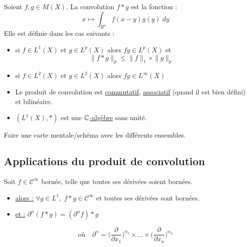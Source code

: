 \begin{theorem}
    Soient $f,g \in M(X)$. La convolution $f \ast g$ est la fonction :
        \[ x \longmapsto \int_{R^n} f(x-y) g(y) \; dy \] 
    Elle est définie dans les cas suivants :
    \begin{itemize}
        \item si $f \in L^1(X)$ et $g \in L^p(X)$ alors $fg \in L^p(X)$ et 
            \[ \| f \ast g\|_p \leq \|f\|_1 \times \|g\|_p \] 
        \item si $f \in L^2(X)$ et $g \in L^2(X)$ alors $fg \in L^\infty(X)$
    \end{itemize}
\end{theorem}

\begin{prop}
    \begin{itemize}
        \item Le produit de convolution est \underline{commutatif}, \underline{associatif} (quand il est bien défini) et bilinéaire.
        \item $(L^1(X),\ast)$ est une \underline{$\mathbb{C}$-algèbre} sans unité. 
    \end{itemize}
\end{prop}

\begin{example}
    Faire une carte mentale/schéma avec les différents ensembles. 
\end{example}

\newpage 

\subsection{Applications du produit de convolution}

\begin{theorem}[Régularisation]
    Soit $f \in \mathcal{C}^\infty$ bornée, telle que toutes ses dérivées soient bornées. 

    \begin{itemize}
        \item[] \underline{alors :} \quad $ \forall g \in L^1, \; f \ast g \in \mathcal{C}^\infty$ et toutes ses dérivées sont bornées. 
        \item[] \underline{et :} \quad \quad $ \partial^\alpha (f \ast g) = (\partial^\alpha f) \ast g $
    \end{itemize}

    \[ \text{où} \quad \partial^\alpha = \Bigg( \frac{\partial}{\partial {x_1}} \Bigg)^{\alpha_1} \times \dots \times \Bigg( \frac{\partial}{\partial {x_n}} \Bigg)^{\alpha_n} \]
\end{theorem}

